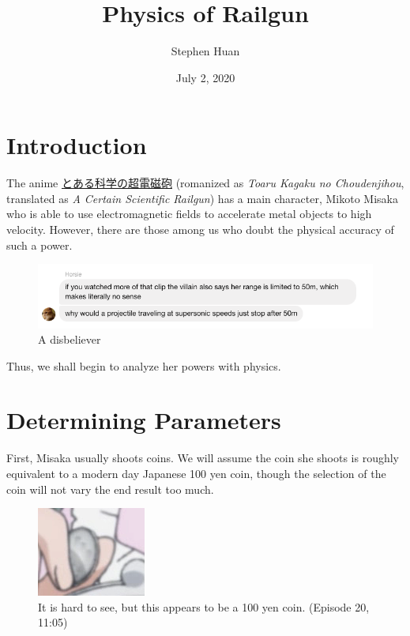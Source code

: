 \documentclass[11pt, oneside]{article}
\title{Physics of Railgun}
\author{Stephen Huan}
\date{July 2, 2020}
\begin{document}
\maketitle

\section{Introduction}

\begin{CJK}{UTF8}{maru} 
The anime \href{https://myanimelist.net/anime/6213/Toaru_Kagaku_no_Railgun}
{とある科学の超電磁砲} 
(romanized as \textit{Toaru Kagaku no Choudenjihou}, 
translated as \textit{A Certain Scientific Railgun}) has a main character,
Mikoto Misaka who is able to use electromagnetic fields to accelerate metal 
objects to high velocity. However, there are those among us who doubt
the physical accuracy of such a power.
\end{CJK}

\begin{figure}[h!]
  \centering
  \includegraphics[scale=0.6]{message}
  \caption{A disbeliever}
\end{figure}

Thus, we shall begin to analyze her powers with physics.

\section{Determining Parameters}

First, Misaka usually shoots coins. We will assume the coin she shoots 
is roughly equivalent to a modern day Japanese 100 yen coin, 
though the selection of the coin will not vary the end result too much.

\begin{figure}
  \vspace{-20pt}
  \centering
  \includegraphics[scale=0.8]{100yen}
  \caption{It is hard to see, but this appears to be a 100 yen coin. (Episode 20, 11:05)}
  \vspace{-40pt}
\end{figure}
\end{document}
